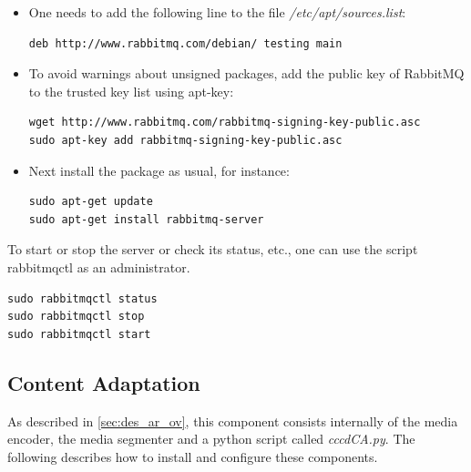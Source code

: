 \begin{itemize}

\item One needs to add the following line to the file \textit{/etc/apt/sources.list}:

\begin{code}
\begin{verbatim}
deb http://www.rabbitmq.com/debian/ testing main
\end{verbatim}
\end{code}

\item To avoid warnings about unsigned packages, add the public key of RabbitMQ to the trusted key list using apt-key:

\begin{code}
\begin{verbatim}
wget http://www.rabbitmq.com/rabbitmq-signing-key-public.asc
sudo apt-key add rabbitmq-signing-key-public.asc
\end{verbatim}
\end{code}

\item Next install the package as usual, for instance:

\begin{code}
\begin{verbatim}
sudo apt-get update
sudo apt-get install rabbitmq-server
\end{verbatim}
\end{code}

\end{itemize} 

To start or stop the server or check its status, etc., one can use the script rabbitmqctl as an administrator. 
\begin{code}
\begin{verbatim}
sudo rabbitmqctl status
sudo rabbitmqctl stop
sudo rabbitmqctl start
\end{verbatim}
\end{code}

\subsection{Content Adaptation\label{sec:eval_te_ca}}
As described in \ref{sec:des_ar_ov}, this component consists internally of the media encoder, the media segmenter and a python script called \textit{cccdCA.py}. The following describes how to install and configure these components.  

